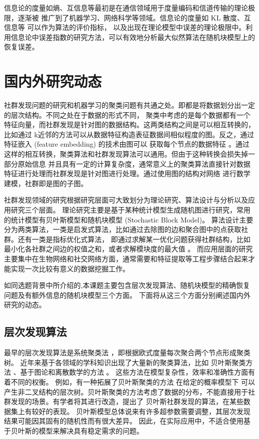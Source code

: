 \documentclass{ctexart}
\begin{document}
信息论的度量如熵、互信息等最初是在通信领域用于度量编码和信道传输的理论极限，逐渐被
推广到了机器学习、网络科学等领域。信息论的度量如 KL 散度、互信息等 可以作为算法的评价指标，
以及出现在理论模型中误差的理论极限中。利用信息论中误差指数的研究方法，可以有效地分析最大似然算法在随机块模型上的
恢复误差。


\section{国内外研究动态}
社群发现问题的研究和机器学习的聚类问题有共通之处。即都是将数据划分出一定的层次结构。不同之处在于数据的形式不同，
聚类中考虑的是每个数据都有一个特征向量，而社群发现是针对图的数据结构。这两类结构之间是可以相互转换的，比如通过
k近邻的方法可以从数据特征构造表征数据间相似程度的图。反之，通过特征嵌入 (feature embedding) 的技术由图可以
获取每个节点的数据特征 \cite{hamilton2017representation}。通过这样的相互转换，聚类算法和社群发现算法可以通用。但由于这种转换会损失掉一部分原始信息
并且具有一定的计算复杂度，通常意义上的聚类算法直接针对数据特征进行处理而社群发现是针对图进行处理。通过使用图的结构对网络
进行数学建模，社群即是图的子图。

社群发现领域的研究根据研究层面可大致划分为理论研究、算法设计与分析以及应用研究三个层面。
理论研究主要是基于某种统计模型生成随机图进行研究，常用的统计模型有贝叶斯模型和随机块模型 (Stochastic Block Model)。
算法设计主要分为两类算法，一类是启发式算法，比如通过去除图的边和聚合图中的点获取社群。还有一类是指标优化式算法，
即通过求解某一优化问题获得社群结构，比如最小化各社群之间边的权值之和，或者求解模块度的最大值 \cite{newman2006modularity}。
而应用层面的研究主要集中在生物网络和社交网络方面，通常需要和特征提取等工程步骤结合起来才能实现一次比较有意义的数据挖掘工作。

如同选题背景中所介绍的,本课题主要包含层次发现算法、随机块模型的精确恢复问题及有额外信息的随机块模型三个方面。
下面将从这三个方面分别阐述国内外研究的动态。
\subsection{层次发现算法}

最早的层次发现算法是系统聚类法 \cite{slink}，即根据欧式度量每次聚合两个节点形成聚类树。
近年来基于各领域的学科知识出现了大量新的聚类算法，比如
贝叶斯聚类方法 \cite{bhc}、基于图论和离散数学的方法 \cite{dasgupta2016cost}
。
这些方法在模型复杂性，效率和准确性方面有着不同的权衡。
例如，有一种拓展了贝叶斯聚类的方法 \cite{blundell2011discovering}
在给定的概率模型下
可以产生非二叉结构的层次树。贝叶斯聚类的方法考虑了数据的分布，不能直接用于社群发现的场景。有学者将其进行改造，提出了
贝叶斯社群发现的算法\cite{RN23}，在某些数据集上有较好的表现。
贝叶斯模型总体说来有许多超参数需要调整，其层次发现结果可能因其固有的随机性而有很大差异。 因此，在实际应用中，不适合使用基于贝叶斯的模型来解决具有稳定需求的问题。 
\end{document}

